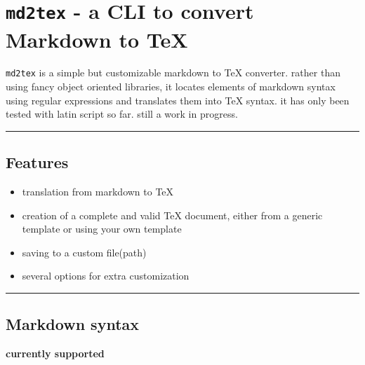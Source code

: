 \section{\texttt{md2tex} - a CLI to convert Markdown to TeX}

\texttt{md2tex} is a simple but customizable markdown to TeX converter. rather than using fancy object oriented 
libraries, it locates elements of markdown syntax using regular expressions and translates them into TeX syntax.
it has only been tested with latin script so far. still a work in progress.

\par\noindent\rule{\linewidth}{0.4pt}
\subsection{Features}

\begin{itemize}
\item translation from markdown to TeX
\item creation of a complete and valid TeX document, either from a generic template or using your own template
\item saving to a custom file(path)
\item several options for extra customization 
\end{itemize}

\par\noindent\rule{\linewidth}{0.4pt}
\subsection{Markdown syntax}

\textbf{currently supported}

